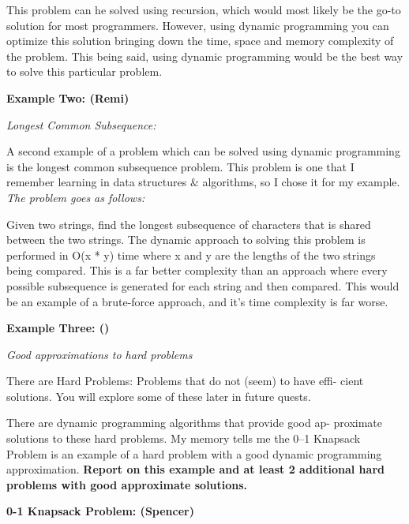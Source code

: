 \documentclass{article}
\begin{document}
This problem can he solved using recursion, which would most likely be
the go-to solution for most programmers. However, using dynamic programming
you can optimize this solution bringing down the time, space and memory
complexity of the problem. This being said, using dynamic programming would
be the best way to solve this particular problem.

\bigskip

\noindent \textbf{Example Two: (Remi)}

\noindent \textit{Longest Common Subsequence:}

A second example of a problem which can be solved using dynamic programming 
is the longest common subsequence problem. This problem is one that I 
remember learning in data structures $\&$ algorithms, so I chose it for my 
example.\\

\noindent \textit{The problem goes as follows:}

Given two strings, find the longest subsequence of characters that is 
shared between the two strings. The dynamic approach to solving this problem
is performed in O(x * y) time where x and y are the lengths of the two 
strings being compared. This is a far better complexity than an approach 
where every possible subsequence is generated for each string and then 
compared. This would be an example of a brute-force approach, and it's time 
complexity is far worse.

\bigskip

\noindent \textbf{Example Three: ()}




\pagebreak

\noindent \textit{Good approximations to hard problems}

\medskip

There are Hard Problems: Problems that do not (seem) to have effi-
cient solutions. You will explore some of these later in future quests.

\medskip

There are dynamic programming algorithms that provide good ap-
proximate solutions to these hard problems. My memory tells me the
0–1 Knapsack Problem is an example of a hard problem with a good
dynamic programming approximation. \textbf{Report on this example and
at least 2 additional hard problems with good approximate solutions.}

\bigskip

\noindent \textbf{0-1 Knapsack Problem: (Spencer)} 
\end{document}
